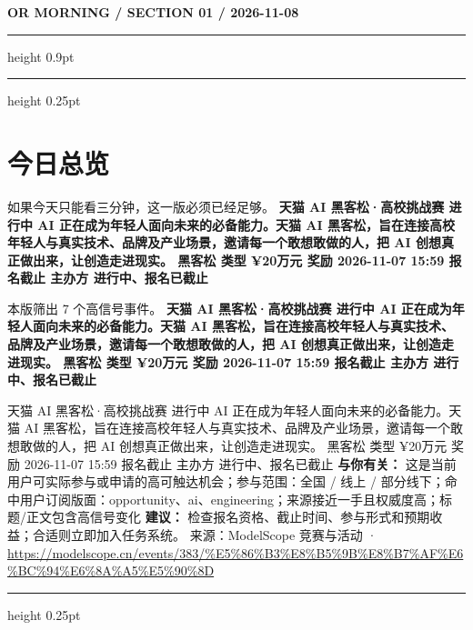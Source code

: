 \documentclass[10.5pt]{ctexart}
\begin{document}
{\small\bfseries OR MORNING / SECTION 01 / 2026-11-08}
\vspace{2mm}
\hrule height 0.9pt
\vspace{1.5mm}
\hrule height 0.25pt
\vspace{4mm}
\section*{今日总览}
{\color{ormuted} 如果今天只能看三分钟，这一版必须已经足够。}
\vspace{2mm}
{\fontsize{25}{29}\selectfont\bfseries 天猫 AI 黑客松·高校挑战赛 进行中 AI 正在成为年轻人面向未来的必备能力。天猫 AI 黑客松，旨在连接高校年轻人与真实技术、品牌及产业场景，邀请每一个敢想敢做的人，把 AI 创想真正做出来，让创造走进现实。 黑客松 类型 ¥20万元 奖励 2026-11-07 15:59 报名截止 主办方 进行中、报名已截止}\par
\vspace{2mm}
{\large 本版筛出 7 个高信号事件。}
\vspace{3mm}
{\Large\bfseries 天猫 AI 黑客松·高校挑战赛 进行中 AI 正在成为年轻人面向未来的必备能力。天猫 AI 黑客松，旨在连接高校年轻人与真实技术、品牌及产业场景，邀请每一个敢想敢做的人，把 AI 创想真正做出来，让创造走进现实。 黑客松 类型 ¥20万元 奖励 2026-11-07 15:59 报名截止 主办方 进行中、报名已截止}\par
天猫 AI 黑客松·高校挑战赛 进行中 AI 正在成为年轻人面向未来的必备能力。天猫 AI 黑客松，旨在连接高校年轻人与真实技术、品牌及产业场景，邀请每一个敢想敢做的人，把 AI 创想真正做出来，让创造走进现实。 黑客松 类型 ¥20万元 奖励 2026-11-07 15:59 报名截止 主办方 进行中、报名已截止
\textbf{与你有关：} 这是当前用户可实际参与或申请的高可触达机会；参与范围：全国 / 线上 / 部分线下；命中用户订阅版面：opportunity、ai、engineering；来源接近一手且权威度高；标题/正文包含高信号变化
\textbf{建议：} 检查报名资格、截止时间、参与形式和预期收益；合适则立即加入任务系统。
{\footnotesize\color{ormuted} 来源：ModelScope 竞赛与活动 · \url{https://modelscope.cn/events/383/%E5%86%B3%E8%B5%9B%E8%B7%AF%E6%BC%94%E6%8A%A5%E5%90%8D}}
\vspace{3mm}
\hrule height 0.25pt
\vspace{3mm}
\end{document}

